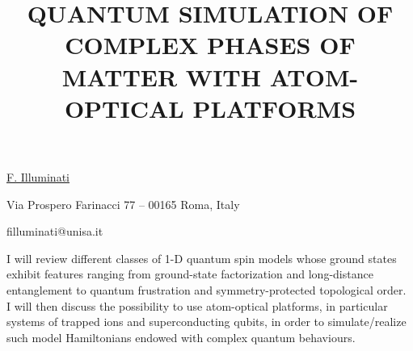 \title{QUANTUM SIMULATION OF COMPLEX PHASES OF MATTER WITH ATOM-OPTICAL PLATFORMS}

\underline{F. Illuminati}

{\normalsize{
\vspace{-4mm} Via Prospero Farinacci 77 -- 00165 Roma, Italy


\email filluminati@unisa.it}}

I will review different classes of 1-D quantum spin models whose ground states exhibit features ranging from ground-state factorization and long-distance entanglement to quantum frustration and symmetry-protected topological order. I will then discuss the possibility to use atom-optical platforms, in particular systems of trapped ions and superconducting qubits, in order to simulate/realize such model Hamiltonians endowed with complex quantum behaviours.

\vspace{\baselineskip}
